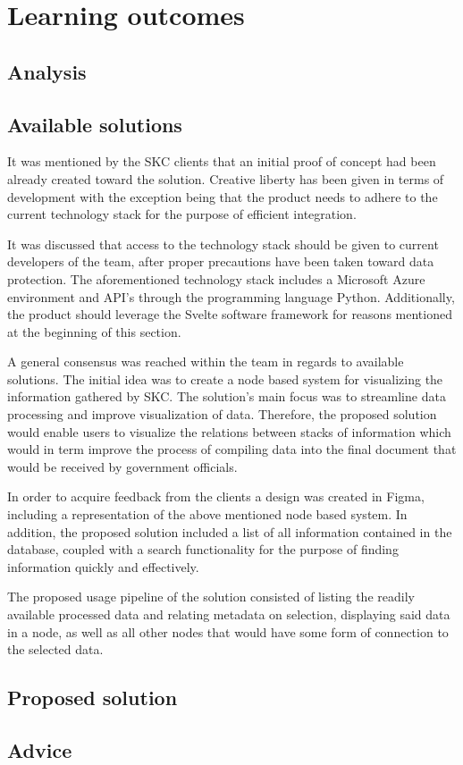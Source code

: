 \section{Learning outcomes}
\label{sec:Learngin-Outcomes}

\subsection{Analysis}
\label{subsec:Analysis}

\subsection{Available solutions}
\label{subsec:Available solutions}

It was mentioned by the SKC clients that an initial proof of concept had been already created toward the solution. Creative liberty has been given in terms of development with the exception being that the product needs to adhere to the current technology stack for the purpose of efficient integration.

It was discussed that access to the technology stack should be given to current developers of the team, after proper precautions have been taken toward data protection. The aforementioned technology stack includes a Microsoft Azure environment and API's through the programming language Python. Additionally, the product should leverage the Svelte software framework for reasons mentioned at the beginning of this section.

A general consensus was reached within the team in regards to available solutions. The initial idea was to create a node based system for visualizing the information gathered by SKC. The solution's main focus was to streamline data processing and improve visualization of data. Therefore, the proposed solution would enable users to visualize the relations between stacks of information which would in term improve the process of compiling data into the final document that would be received by government officials.

In order to acquire feedback from the clients a design was created in Figma, including a representation of the above mentioned node based system. In addition, the proposed solution included a list of all information contained in the database, coupled with a search functionality for the purpose of finding information quickly and effectively.

The proposed usage pipeline of the solution consisted of listing the readily available processed data and relating metadata on selection, displaying said data in a node, as well as all other nodes that would have some form of connection to the selected data.


\subsection{Proposed solution}
\label{subsec:Proposed solution}

\subsection{Advice}
\label{subsec:Advice}


